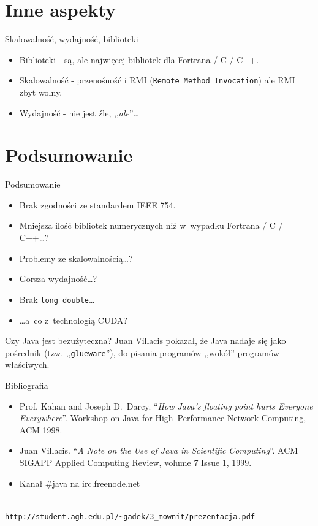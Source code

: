 \documentclass{beamer}
\begin{document}
\section{Inne aspekty}

\begin{frame}{Skalowalność, wydajność, biblioteki}
	\begin{itemize}
		\item Biblioteki - są, ale najwięcej bibliotek dla Fortrana / C / C++.
		\item Skalowalność - przenośność i RMI (\texttt{Remote Method Invocation}) ale RMI zbyt wolny.
		\item Wydajność - nie jest źle, ,,\emph{ale}''\ldots
	\end{itemize}
\end{frame}

\section{Podsumowanie}

\begin{frame}{Podsumowanie}
	\begin{itemize}
		\item Brak zgodności ze standardem IEEE 754.
		\item Mniejsza ilość bibliotek numerycznych niż w~wypadku Fortrana / C / C++\ldots ?
		\item Problemy ze skalowalnością\ldots ?
		\item Gorsza wydajność\ldots ?
		\item Brak \texttt{long double}\ldots
		\item \ldots a~co z~technologią CUDA?
	\end{itemize}

	\begin{block}{Czy Java jest bezużyteczna?}
		Juan Villacis pokazał, że Java nadaje się jako pośrednik (tzw. ,,\texttt{glueware}''), do pisania
		programów ,,wokół'' programów właściwych.
	\end{block}
\end{frame}

\begin{frame}{Bibliografia}
	\begin{itemize}
		\item{Prof. Kahan and Joseph D.~Darcy. ``\emph{How Java's floating point hurts Everyone Everywhere}''.
			Workshop on Java for High--Performance Network Computing, ACM 1998.}
		\item{Juan Villacis. ``\emph{A Note on the Use of Java in Scientific Computing}''.
			ACM SIGAPP Applied Computing Review, volume 7 Issue 1, 1999.}
		\item{Kanał \#java na irc.freenode.net}
	\end{itemize}
	\ \\
	\texttt{http://student.agh.edu.pl/\textasciitilde gadek/3\_mownit/prezentacja.pdf}
\end{frame}
\end{document}
